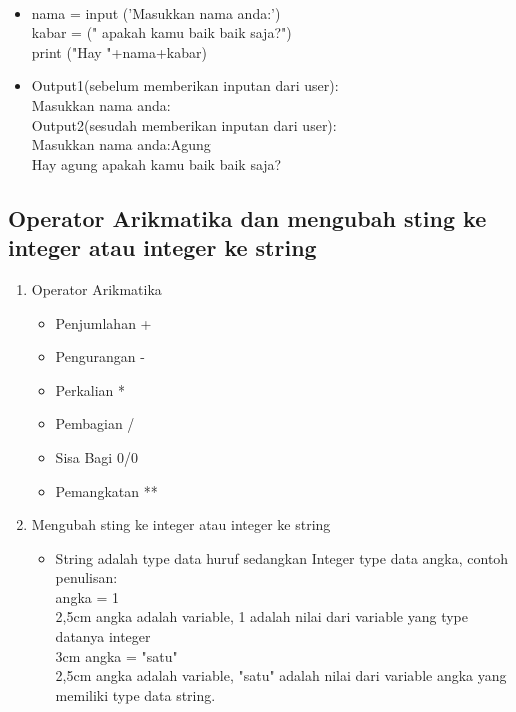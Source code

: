 \documentclass{article}
\begin{document}
        \paragraph{}
            \begin{itemize}
                \item   nama = input ('Masukkan nama anda:')\\
                        kabar = (" apakah kamu baik baik saja?")\\
                        print ("Hay "+nama+kabar)\\    
                    
                 \item  Output1(sebelum memberikan inputan dari user):\\
                            Masukkan nama anda:\\
                        Output2(sesudah memberikan inputan dari user):\\
                            Masukkan nama anda:Agung\\
                            Hay agung apakah kamu baik baik saja?                
            \end{itemize}
            
    \subsection{Operator Arikmatika dan mengubah sting ke integer atau integer ke string}
        \begin{enumerate}
            \item Operator Arikmatika
                \begin{itemize}
                    \item Penjumlahan +
                    \item Pengurangan -
                    \item Perkalian   *
                    \item Pembagian   /
                    \item Sisa Bagi  0/0
                    \item Pemangkatan **
                \end{itemize}
            \item Mengubah sting ke integer atau integer ke string
                \begin{itemize}
                    \item String adalah type data huruf sedangkan Integer type data angka, contoh penulisan:\\
                        angka = 1\\
                        {2,5cm} angka adalah variable, 1 adalah nilai dari variable yang type datanya integer\\
                        {3cm} angka = "satu"\\
                        {2,5cm} angka adalah variable, "satu" adalah nilai dari variable angka yang memiliki type data string.
                    
                \end{itemize}
        \end{enumerate}
        
\end{document}
